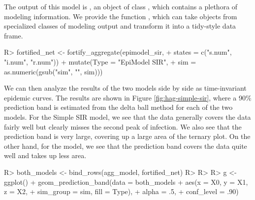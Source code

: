 \documentclass[
  shortnames]{jss}
\begin{document}
The output of this model is , an object of class
, which contains a plethora of modeling information. We
provide the function , which can take objects
from specialized classes of modeling output and transform it into a
tidy-style data frame.

\begin{CodeChunk}
\begin{CodeInput}
R> fortified_net <- fortify_aggregate(epimodel_sir, 
+                                    states = c("s.num", "i.num", "r.num")) %
+   mutate(Type = "EpiModel SIR",
+          sim = as.numeric(gsub("sim", "", sim)))
\end{CodeInput}
\end{CodeChunk}

We can then analyze the results of the two models side by side as
time-invariant epidemic curves. The results are shown in Figure
\ref{fig:hag-simple-sir}, where a 90\% prediction band is estimated from
the delta ball method for each of the two models. For the Simple SIR
model, we see that the data generally covers the data fairly well but
clearly misses the second peak of infection. We also see that the
prediction band is very large, covering up a large area of the ternary
plot. On the other hand, for the  model, we see that the
prediction band covers the data quite well and takes up less area.

\begin{CodeChunk}
\begin{CodeInput}
R> both_models <- bind_rows(agg_model, fortified_net)
R> 
R> 
R> g <- ggplot() + geom_prediction_band(data = both_models %
+          aes(x = X0, y = X1, z = X2,
+               sim_group = sim, fill = Type),
+          alpha = .5,
+          conf_level = .90) 
\end{CodeInput}
\end{CodeChunk}
\end{document}
